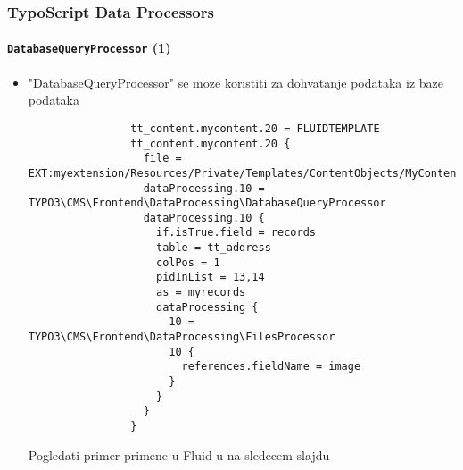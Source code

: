 \begin{frame}[fragile]
	\frametitle{TypoScript Data Processors}
	\framesubtitle{\texttt{DatabaseQueryProcessor} (1)}

	\lstset{basicstyle=\tiny\ttfamily}

	\begin{itemize}

		\item "DatabaseQueryProcessor" se moze koristiti za dohvatanje podataka iz baze podataka

			\begin{lstlisting}
				tt_content.mycontent.20 = FLUIDTEMPLATE
				tt_content.mycontent.20 {
				  file = EXT:myextension/Resources/Private/Templates/ContentObjects/MyContent.html
				  dataProcessing.10 = TYPO3\CMS\Frontend\DataProcessing\DatabaseQueryProcessor
				  dataProcessing.10 {
				    if.isTrue.field = records
				    table = tt_address
				    colPos = 1
				    pidInList = 13,14
				    as = myrecords
				    dataProcessing {
				      10 = TYPO3\CMS\Frontend\DataProcessing\FilesProcessor
				      10 {
				        references.fieldName = image
				      }
				    }
				  }
				}
			\end{lstlisting}


			\vspace{-0.2cm}
			\small
				Pogledati primer primene u Fluid-u na sledecem slajdu
			\normalsize

	\end{itemize}

\end{frame}


